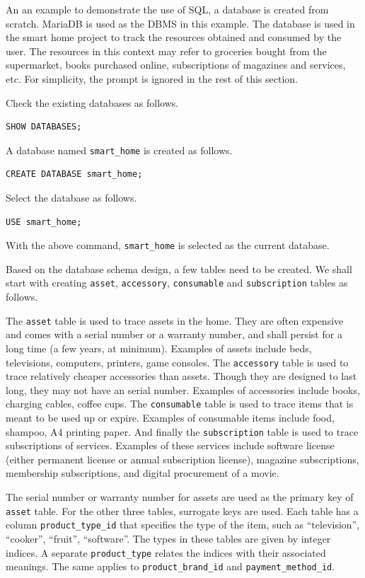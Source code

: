 An an example to demonstrate the use of SQL, a database is created from scratch. MariaDB is used as the DBMS in this example. The database is used in the smart home project to track the resources obtained and consumed by the user. The resources in this context may refer to groceries bought from the supermarket, books purchased online, subscriptions of magazines and services, etc. For simplicity, the prompt is ignored in the rest of this section.

Check the existing databases as follows.
\begin{lstlisting}
SHOW DATABASES;
\end{lstlisting}
A database named \verb|smart_home| is created as follows.
\begin{lstlisting}
CREATE DATABASE smart_home;
\end{lstlisting}
Select the database as follows.
\begin{lstlisting}
USE smart_home;
\end{lstlisting}
With the above command, \verb|smart_home| is selected as the current database.

Based on the database schema design, a few tables need to be created. We shall start with creating \verb|asset|, \verb|accessory|, \verb|consumable| and \verb|subscription| tables as follows.

The \verb|asset| table is used to trace assets in the home. They are often expensive and comes with a serial number or a warranty number, and shall persist for a long time (a few years, at minimum). Examples of assets include beds, televisions, computers, printers, game consoles. The \verb|accessory| table is used to trace relatively cheaper accessories than assets. Though they are designed to last long, they may not have an serial number. Examples of accessories include books, charging cables, coffee cups. The \verb|consumable| table is used to trace items that is meant to be used up or expire. Examples of consumable items include food, shampoo, A4 printing paper. And finally the \verb|subscription| table is used to trace subscriptions of services. Examples of these services include software license (either permanent license or annual subscription license), magazine subscriptions, membership subscriptions, and digital procurement of a movie.

The serial number or warranty number for assets are used as the primary key of \verb|asset| table. For the other three tables, surrogate keys are used. Each table has a column \verb|product_type_id| that specifies the type of the item, such as ``television'', ``cooker'', ``fruit'', ``software''. The types in these tables are given by integer indices. A separate \verb|product_type| relates the indices with their associated meanings. The same applies to \verb|product_brand_id| and \verb|payment_method_id|.

